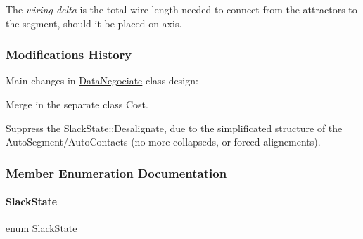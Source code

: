  The {\itshape wiring delta} is the total wire length needed to connect from the attractors to the segment, should it be placed on {\ttfamily axis}.

\hypertarget{classKite_1_1DataNegociate_secDataNegociateModifications}{}\subsubsection{Modifications History}\label{classKite_1_1DataNegociate_secDataNegociateModifications}
Main changes in \hyperlink{classKite_1_1DataNegociate}{Data\+Negociate} class design\+:
\begin{DoxyItemize}
\item Merge in the separate class {\ttfamily Cost}.
\item Suppress the {\ttfamily Slack\+State\+::\+Desalignate}, due to the simplificated structure of the Auto\+Segment/\+Auto\+Contacts (no more collapseds, or forced alignements). 
\end{DoxyItemize}

\subsubsection{Member Enumeration Documentation}
\mbox{\label{classKite_1_1DataNegociate_ab7ccb6fc1f298728995250a3bbcf18c7}} 
\paragraph{\texorpdfstring{Slack\+State}{SlackState}}
{\footnotesize\ttfamily enum \hyperlink{classKite_1_1DataNegociate_ab7ccb6fc1f298728995250a3bbcf18c7}{Slack\+State}}

